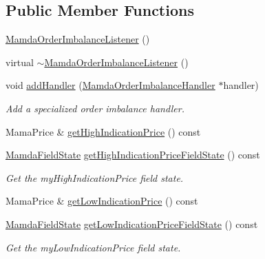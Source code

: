 \subsection*{Public Member Functions}
\begin{CompactItemize}
\item 
\hyperlink{classWombat_1_1MamdaOrderImbalanceListener_715d1ae2811b3dfc5bf2475dbc45ce59}{Mamda\-Order\-Imbalance\-Listener} ()
\item 
virtual \hyperlink{classWombat_1_1MamdaOrderImbalanceListener_ac342b8ded254fe784abe31afb3dfb91}{$\sim$Mamda\-Order\-Imbalance\-Listener} ()
\item 
void \hyperlink{classWombat_1_1MamdaOrderImbalanceListener_13083aab1c61080615dd411b4caa8ce6}{add\-Handler} (\hyperlink{classWombat_1_1MamdaOrderImbalanceHandler}{Mamda\-Order\-Imbalance\-Handler} $\ast$handler)
\begin{CompactList}\small\item\em Add a specialized order imbalance handler. \item\end{CompactList}\item 
Mama\-Price \& \hyperlink{classWombat_1_1MamdaOrderImbalanceListener_596c5c1e351924b74e0f81af784a45a1}{get\-High\-Indication\-Price} () const 
\item 
\hyperlink{namespaceWombat_93aac974f2ab713554fd12a1fa3b7d2a}{Mamda\-Field\-State} \hyperlink{classWombat_1_1MamdaOrderImbalanceListener_6272673c1cf08580d09ec73d0e458734}{get\-High\-Indication\-Price\-Field\-State} () const 
\begin{CompactList}\small\item\em Get the my\-High\-Indication\-Price field state. \item\end{CompactList}\item 
Mama\-Price \& \hyperlink{classWombat_1_1MamdaOrderImbalanceListener_d52ff9594f69255d8ac514ffa8eabc84}{get\-Low\-Indication\-Price} () const 
\item 
\hyperlink{namespaceWombat_93aac974f2ab713554fd12a1fa3b7d2a}{Mamda\-Field\-State} \hyperlink{classWombat_1_1MamdaOrderImbalanceListener_e6c44322841ce2147abacb25a5cf8fae}{get\-Low\-Indication\-Price\-Field\-State} () const 
\begin{CompactList}\small\item\em Get the my\-Low\-Indication\-Price field state. \item\end{CompactList}\item 

\end{CompactItemize}
